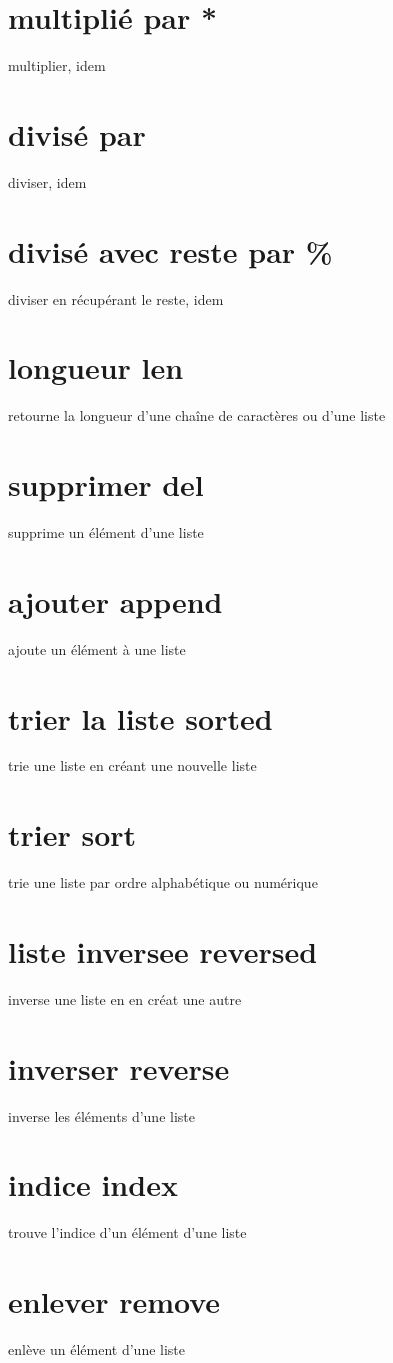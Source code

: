 \documentclass{book}
\begin{document}
\section{multiplié par * }
  multiplier, idem
\section{divisé par \  }
  diviser, idem
\section{divisé avec reste par \% }
  diviser en récupérant le reste, idem
\section{longueur len }
  retourne la longueur d'une chaîne de caractères ou d'une liste
\section{supprimer del }
  supprime un élément d'une liste
\section{ajouter append }
  ajoute un élément à une liste
\section{trier la liste sorted }
  trie une liste en créant une nouvelle liste 
\section{trier sort }
  trie une liste par ordre alphabétique ou numérique
\section{liste inversee reversed }
  inverse une liste en en créat une autre
\section{inverser reverse }
  inverse les éléments d'une liste
\section{indice index }
  trouve l'indice d'un élément d'une liste
\section{enlever remove }
  enlève un élément d'une liste
\end{document}
